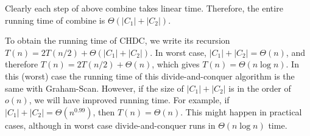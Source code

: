 Clearly each step of above combine takes linear time. Therefore, the entire running time of combine is $\Theta(|C_1| + |C_2|)$.

To obtain the running time of CHDC, we write its recursion $T(n) = 2T(n/2) + \Theta(|C_1| + |C_2|)$.
In worst case, $|C_1| + |C_2| = \Theta(n)$, and therefore $T(n) = 2T(n/2) + \Theta(n)$, which gives $T(n) = \Theta(n\log n)$.
In this (worst) case the running time of this divide-and-conquer algorithm is the same with Graham-Scan.
However, if the size of $|C_1| + |C_2|$ is in the order of $o(n)$, we will have
improved running time.  For example, if $|C_1| + |C_2| = \Theta(n^{0.99})$, then $T(n) = \Theta(n)$.  
This might happen in practical cases, although in worst case divide-and-conquer runs in $\Theta(n\log n)$ time.
